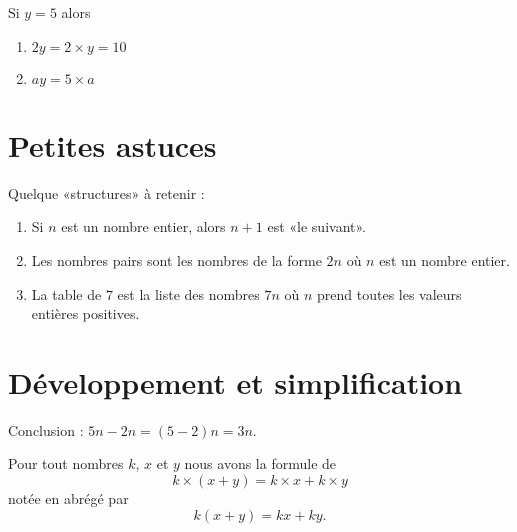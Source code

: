\begin{example}
    Si \( y=5\) alors
    \begin{enumerate}
        \item
            \( 2y=2\times y=10\)
        \item
            \( ay=5\times a\)
    \end{enumerate}
\end{example}

\section{Petites astuces}

Quelque «structures» à retenir :
\begin{enumerate}
    \item
        Si \( n\) est un nombre entier, alors \( n+1\) est «le suivant».
    \item
        Les nombres pairs sont les nombres de la forme \( 2n\) où \( n\) est un nombre entier.
    \item
        La table de \( 7\) est la liste des nombres \( 7n\) où \( n\) prend toutes les valeurs entières positives.
\end{enumerate}

\section{Développement et simplification}



Conclusion : \( 5n-2n=(5-2)n=3n\).

\begin{Aretenir}
    Pour tout nombres \( k\), \( x\) et \( y\) nous avons la formule de 
    \begin{equation}
        k\times (x+y)=k\times x+k\times y
    \end{equation}
    notée en abrégé par
    \begin{equation}
        k(x+y)=kx+ky.
    \end{equation}
\end{Aretenir}


